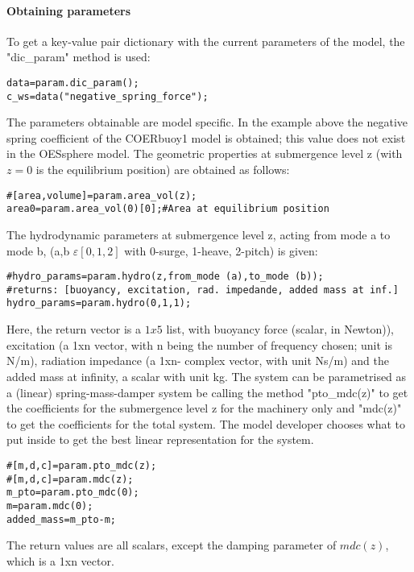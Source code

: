 \documentclass[oneside,10pt,a4paper]{book}
\begin{document}
\paragraph{Obtaining parameters}
To get a key-value pair dictionary with the current parameters of the model, the "dic\_param" method is used:
\begin{verbatim}
data=param.dic_param();
c_ws=data("negative_spring_force");
\end{verbatim}
The parameters obtainable are model specific. In the example above the negative spring coefficient of the COERbuoy1 model is obtained; this value does not exist in the OESsphere model.
The geometric properties at submergence level z (with $z=0$ is the equilibrium position) are obtained as follows:
\begin{verbatim}
#[area,volume]=param.area_vol(z);
area0=param.area_vol(0)[0];#Area at equilibrium position
\end{verbatim}
The hydrodynamic parameters at submergence level z, acting from mode a to mode b, (a,b $\varepsilon[0,1,2]$ with 0-surge, 1-heave, 2-pitch) is given:
\begin{verbatim}
#hydro_params=param.hydro(z,from_mode (a),to_mode (b));
#returns: [buoyancy, excitation, rad. impedande, added mass at inf.]
hydro_params=param.hydro(0,1,1);
\end{verbatim}
Here, the return vector is a $1x5$ list, with buoyancy force (scalar, in Newton)), excitation (a 1xn vector, with n being the number of frequency chosen; unit is N/m), radiation impedance (a 1xn- complex vector, with unit Ns/m) and the added mass at infinity, a scalar with unit kg.
The system can be parametrised as a (linear) spring-mass-damper system be calling the method "pto\_mdc(z)" to get the coefficients for the submergence level z for the machinery only and "mdc(z)" to get the coefficients for the total system. The model developer chooses what to put inside to get the best linear representation for the system.
\begin{verbatim}
#[m,d,c]=param.pto_mdc(z);
#[m,d,c]=param.mdc(z);
m_pto=param.pto_mdc(0);
m=param.mdc(0);
added_mass=m_pto-m;
\end{verbatim}
The return values are all scalars, except the damping parameter of $mdc(z)$, which is a 1xn vector.
\end{document}
